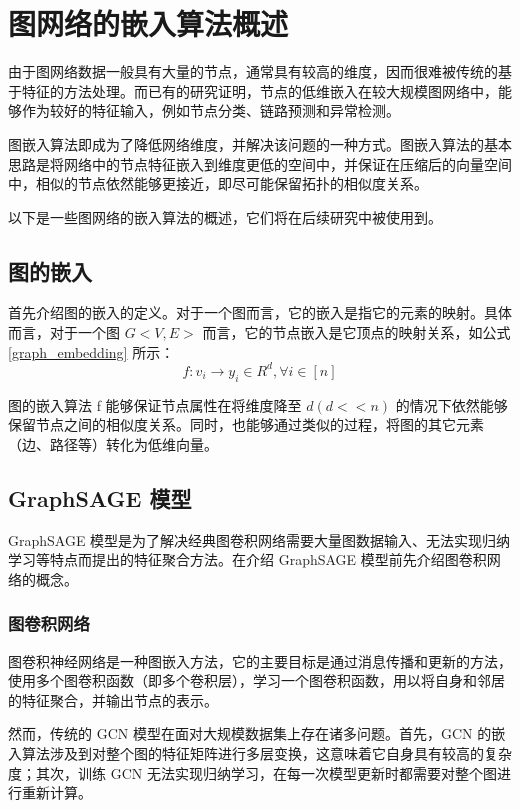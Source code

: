 \section{图网络的嵌入算法概述}

由于图网络数据一般具有大量的节点，通常具有较高的维度，因而很难被传统的基于特征的方法处理。而已有的研究证明，节点的低维嵌入在较大规模图网络中，能够作为较好的特征输入，例如节点分类、链路预测和异常检测。

图嵌入算法即成为了降低网络维度，并解决该问题的一种方式。图嵌入算法的基本思路是将网络中的节点特征嵌入到维度更低的空间中，并保证在压缩后的向量空间中，相似的节点依然能够更接近，即尽可能保留拓扑的相似度关系。

以下是一些图网络的嵌入算法的概述，它们将在后续研究中被使用到。

\subsection{图的嵌入}

首先介绍图的嵌入的定义。对于一个图而言，它的嵌入是指它的元素的映射。具体而言，对于一个图 $G<V,E>$ 而言，它的节点嵌入是它顶点的映射关系，如公式 \ref{graph_embedding} 所示：
\begin{equation} \label{graph_embedding}
f:v_i\rightarrow y_i \in R^d, \forall i \in [n]
\end{equation}

图的嵌入算法 f 能够保证节点属性在将维度降至 $d(d<<n)$ 的情况下依然能够保留节点之间的相似度关系。同时，也能够通过类似的过程，将图的其它元素（边、路径等）转化为低维向量。

\subsection{GraphSAGE 模型}

GraphSAGE 模型是为了解决经典图卷积网络需要大量图数据输入、无法实现归纳学习等特点而提出的特征聚合方法。在介绍 GraphSAGE 模型前先介绍图卷积网络的概念。

\subsubsection{图卷积网络}

图卷积神经网络是一种图嵌入方法，它的主要目标是通过消息传播和更新的方法，使用多个图卷积函数（即多个卷积层），学习一个图卷积函数，用以将自身和邻居的特征聚合，并输出节点的表示。

然而，传统的 GCN 模型在面对大规模数据集上存在诸多问题。首先，GCN 的嵌入算法涉及到对整个图的特征矩阵进行多层变换，这意味着它自身具有较高的复杂度；其次，训练 GCN 无法实现归纳学习，在每一次模型更新时都需要对整个图进行重新计算。

